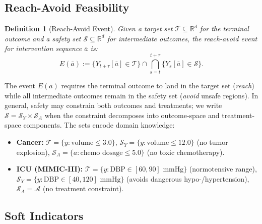 \documentclass{article}
\newtheorem{definition}{Definition}
\newcommand{\R}{\mathbb{R}}
\newcommand{\ba}{\bar{a}}
\newcommand{\cT}{\mathcal{T}}
\newcommand{\cS}{\mathcal{S}}
\newcommand{\cA}{\mathcal{A}}
\begin{document}
\subsection{Reach-Avoid Feasibility}
\label{sec:ra_feasibility}

\begin{definition}[Reach-Avoid Event]
\label{def:ra_event}
Given a target set $\cT \subseteq \R^d$ for the terminal outcome and a safety set $\cS \subseteq \R^d$ for intermediate outcomes, the \emph{reach-avoid event} for intervention sequence $\ba$ is:
\begin{equation}
E(\ba) := \{Y_{t+\tau}[\ba] \in \cT\} \cap \bigcap_{s=t}^{t+\tau} \{Y_s[\ba] \in \cS\}.
\end{equation}
\end{definition}

The event $E(\ba)$ requires the terminal outcome to land in the target set (\emph{reach}) while all intermediate outcomes remain in the safety set (\emph{avoid} unsafe regions). In general, safety may constrain both outcomes and treatments; we write $\cS = \cS_Y \times \cS_A$ when the constraint decomposes into outcome-space and treatment-space components. The sets encode domain knowledge:
\begin{itemize}
    \item \textbf{Cancer:} $\cT = \{y : \text{volume} \leq 3.0\}$, $\cS_Y = \{y : \text{volume} \leq 12.0\}$ (no tumor explosion), $\cS_A = \{a : \text{chemo dosage} \leq 5.0\}$ (no toxic chemotherapy).
    \item \textbf{ICU (MIMIC-III):} $\cT = \{y : \text{DBP} \in [60, 90] \text{ mmHg}\}$ (normotensive range), $\cS_Y = \{y : \text{DBP} \in [40, 120] \text{ mmHg}\}$ (avoids dangerous hypo-/hypertension), $\cS_A = \cA$ (no treatment constraint).
\end{itemize}

\subsection{Soft Indicators}
\label{sec:soft_indicators}
\end{document}
